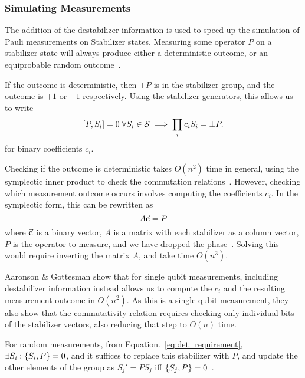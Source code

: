 \subsubsection{Simulating Measurements}
The addition of the destabilizer information is  used to speed up the simulation of Pauli measurements on Stabilizer states. Measuring some operator $P$ on a stabilizer state will always produce either a deterministic outcome, or an equiprobable random outcome~\cite{Gottesman1998b}.\par
If the outcome is deterministic, then $\pm P$ is in the stabilizer group, and the outcome is $+1$ or $-1$ respectively. Using the stabilizer generators, this allows us to write 
\begin{equation}
    \comm{P}{S_{i}}=0\;\forall S_{i}\in\mathcal{S} \implies \prod_{i}c_{i}S_{i} = \pm P. \label{eq:det_requirement}
\end{equation}
for binary coefficients $c_{i}$.\par
Checking if the outcome is deterministic takes $O(n^{2})$ time in general, using the symplectic inner product to check the commutation relations~\cite{Dehaene2003}. However, checking which measurement outcome occurs involves computing the coefficients $c_{i}$. In the symplectic form, this can be rewritten as
\[
    A\va{c}=P
\]
where $\va{c}$ is a binary vector, $A$ is a matrix with each stabilizer as a column vector, $P$ is the operator to measure, and we have dropped the phase~\cite{Aaronson2004}. Solving this would require inverting the matrix $A$, and take time $O(n^{3})$.\par
Aaronson \& Gottesman show that for single qubit measurements, including destabilizer information instead allows us to compute the $c_{i}$ and the resulting measurement outcome in $O(n^{2})$. As this is a single qubit measurement, they also show that the commutativity relation requires checking only individual bits of the stabilizer vectors, also reducing that step to $O(n)$ time.\par
For random measurements, from Equation.~\ref{eq:det_requirement}, $\exists S_{i}:\acomm{S_{i}}{P}=0$, and it suffices to replace this stabilizer with $P$, and update the other elements of the group as $S_{j}'=PS_{j}$ iff $\acomm{S_{j}}{P}=0$~\cite{Gottesman1998b,Aaronson2004}.
